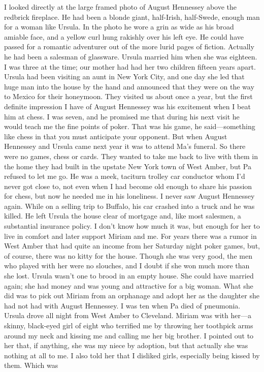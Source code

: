 \documentclass{novel}
\begin{document}
\begin{ChapterStart}

\vspace{3\nbs}
\end{ChapterStart}


I looked directly at the large framed photo of August Hennessey above the redbrick fireplace. He had been a blonde giant, half-Irish, half-Swede, enough man for a woman like Ursula. In the photo he wore a grin as wide as his broad amiable face, and a yellow curl hung rakishly over his left eye. He could have passed for a romantic adventurer out of the more lurid pages of fiction. Actually he had been a salesman of glassware. Ursula married him when she was eighteen. I was three at the time; our mother had had her two children fifteen years apart. Ursula had been visiting an aunt in New York City, and one day she led that huge man into the house by the hand and announced that they were on the way to Mexico for their honeymoon. They visited us about once a year, but the first definite impression I have of August Hennessey was his excitement when I beat him at chess. I was seven, and he promised me that during his next visit he would teach me the fine points of poker. That was his game, he said—something like chess in that you must anticipate your opponent. But when August Hennessey and Ursula came next year it was to attend Ma’s funeral. So there were no games, chess or cards. They wanted to take me back to live with them in the home they had built in the upstate New York town of West Amber, but Pa refused to let me go. He was a meek, taciturn trolley car conductor whom I’d never got close to, not even when I had become old enough to share his passion for chess, but now he needed me in his loneliness. I never saw August Hennessey again. While on a selling trip to Buffalo, his car crashed into a truck and he was killed. He left Ursula the house clear of mortgage and, like most salesmen, a substantial insurance policy. I don’t know how much it was, but enough for her to live in comfort and later support Miriam and me. For years there was a rumor in West Amber that had quite an income from her Saturday night poker games, but, of course, there was no kitty for the house. Though she was very good, the men who played with her were no slouches, and I doubt if she won much more than she lost. Ursula wasn’t one to brood in an empty house. She could have married again; she had money and was young and attractive for a big woman. What she did was to pick out Miriam from an orphanage and adopt her as the daughter she had not had with August Hennessey. I was ten when Pa died of pneumonia. Ursula drove all night from West Amber to Cleveland. Miriam was with her—a skinny, black-eyed girl of eight who terrified me by throwing her toothpick arms around my neck and kissing me and calling me her big brother. I pointed out to her that, if anything, she was my niece by adoption, but that actually she was nothing at all to me. I also told her that I disliked girls, especially being kissed by them. Which was 
\end{document}
